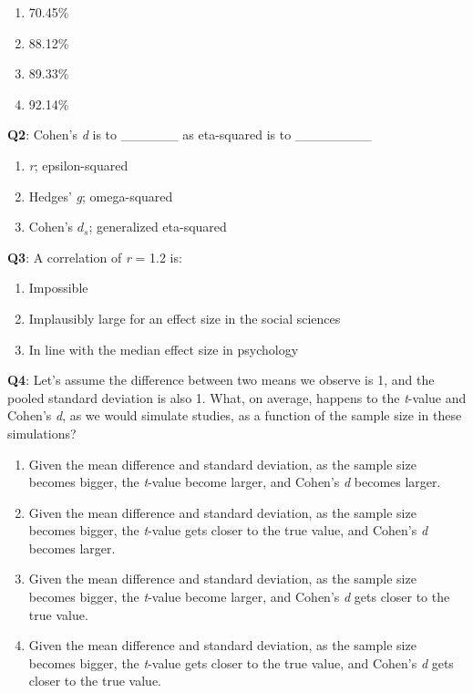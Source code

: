 \documentclass[
  oneside]{book}
\providecommand{\tightlist}{%
  \setlength{\itemsep}{0pt}\setlength{\parskip}{0pt}}
\begin{document}
\begin{enumerate}
\def\labelenumi{\Alph{enumi})}
\tightlist
\item
  70.45\%
\item
  88.12\%
\item
  89.33\%
\item
  92.14\%
\end{enumerate}

\textbf{Q2}: Cohen's \emph{d} is to \_\_\_\_\_\_ as eta-squared is to \_\_\_\_\_\_\_\_

\begin{enumerate}
\def\labelenumi{\Alph{enumi})}
\tightlist
\item
  \emph{r}; epsilon-squared
\item
  Hedges' \emph{g}; omega-squared
\item
  Cohen's \(d_s\); generalized eta-squared
\end{enumerate}

\textbf{Q3}: A correlation of \emph{r} = 1.2 is:

\begin{enumerate}
\def\labelenumi{\Alph{enumi})}
\tightlist
\item
  Impossible
\item
  Implausibly large for an effect size in the social sciences
\item
  In line with the median effect size in psychology
\end{enumerate}

\textbf{Q4}: Let's assume the difference between two means we observe is 1, and the pooled standard deviation is also 1. What, on average, happens to the \emph{t}-value and Cohen's \emph{d}, as we would simulate studies, as a function of the sample size in these simulations?

\begin{enumerate}
\def\labelenumi{\Alph{enumi})}
\tightlist
\item
  Given the mean difference and standard deviation, as the sample size becomes bigger, the \emph{t}-value become larger, and Cohen's \emph{d} becomes larger.
\item
  Given the mean difference and standard deviation, as the sample size becomes bigger, the \emph{t}-value gets closer to the true value, and Cohen's \emph{d} becomes larger.
\item
  Given the mean difference and standard deviation, as the sample size becomes bigger, the \emph{t}-value become larger, and Cohen's \emph{d} gets closer to the true value.
\item
  Given the mean difference and standard deviation, as the sample size becomes bigger, the \emph{t}-value gets closer to the true value, and Cohen's \emph{d} gets closer to the true value.
\end{enumerate}
\end{document}
